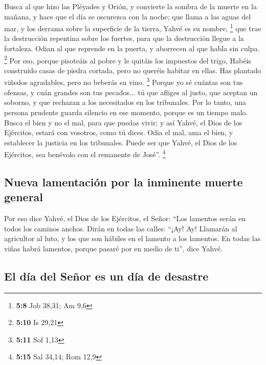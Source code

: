  Busca al que hizo las Pléyades y Orión, y convierte la
sombra de la muerte en la mañana, y hace que el día se oscurezca con la
noche; que llama a las aguas del mar, y los derrama sobre la superficie
de la tierra, Yahvé es su nombre, \footnote{\textbf{5:8} Job 38,31; Am
  9,6}  que trae la destrucción repentina sobre los
fuertes, para que la destrucción llegue a la fortaleza. 
Odian al que reprende en la puerta, y aborrecen al que habla sin culpa.
\footnote{\textbf{5:10} Is 29,21}  Por eso, porque
pisoteáis al pobre y le quitáis los impuestos del trigo, Habéis
construido casas de piedra cortada, pero no queréis habitar en ellas.
Has plantado viñedos agradables, pero no beberás su vino. \footnote{\textbf{5:11}
  Sof 1,13}  Porque yo sé cuántas son tus ofensas, y cuán
grandes son tus pecados... tú que afliges al justo, que aceptan un
soborno, y que rechazan a los necesitados en los tribunales.
 Por lo tanto, una persona prudente guarda silencio en
ese momento, porque es un tiempo malo.  Busca el bien y
no el mal, para que puedas vivir; y así Yahvé, el Dios de los Ejércitos,
estará con vosotros, como tú dices.  Odia el mal, ama el
bien, y establecer la justicia en los tribunales. Puede ser que Yahvé,
el Dios de los Ejércitos, sea benévolo con el remanente de José''.
\footnote{\textbf{5:15} Sal 34,14; Rom 12,9}

\hypertarget{nueva-lamentaciuxf3n-por-la-inminente-muerte-general}{%
\subsection{Nueva lamentación por la inminente muerte
general}\label{nueva-lamentaciuxf3n-por-la-inminente-muerte-general}}

 Por eso dice Yahvé, el Dios de los Ejércitos, el Señor:
``Los lamentos serán en todos los caminos anchos. Dirán en todas las
calles: ``¡Ay! Ay! Llamarán al agricultor al luto, y los que son hábiles
en el lamento a los lamentos.  En todas las viñas habrá
lamentos, porque pasaré por en medio de ti'', dice Yahvé.

\hypertarget{el-duxeda-del-seuxf1or-es-un-duxeda-de-desastre}{%
\subsection{El día del Señor es un día de
desastre}\label{el-duxeda-del-seuxf1or-es-un-duxeda-de-desastre}}


